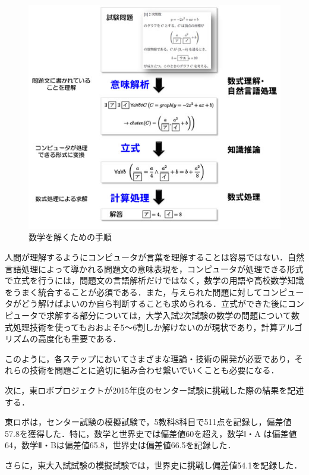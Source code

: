 \begin{figure}[h]
\centering
\includegraphics[width=15cm]{10b.jpg}
\caption{数学を解くための手順}\label{図}
\end{figure}

人間が理解するようにコンピュータが言葉を理解することは容易ではない．自然言語処理によって導かれる問題文の意味表現を，コンピュータが処理できる形式で立式を行うには，問題文の言語解析だけではなく，数学の用語や高校数学知識をうまく統合することが必須である．また，与えられた問題に対してコンピュータがどう解けばよいのか自ら判断することも求められる．立式ができた後にコンピュータで求解する部分については，大学入試2次試験の数学の問題について数式処理技術を使ってもおおよそ5～6割しか解けないのが現状であり，計算アルゴリズムの高度化も重要である．

このように，各ステップにおいてさまざまな理論・技術の開発が必要であり，それらの技術を問題ごとに適切に組み合わせ繋いでいくことも必要になる．

\clearpage

次に，東ロボプロジェクトが2015年度のセンター試験に挑戦した際の結果を記述する．

東ロボは，センター試験の模擬試験で，5教科8科目で511点を記録し，偏差値57.8を獲得した．特に，数学と世界史では偏差値60を超え，数学Ⅰ・A は偏差値64，数学Ⅱ・Bは偏差値65.8，世界史は偏差値66.5を記録した．

さらに，東大入試試験の模擬試験では，世界史に挑戦し偏差値54.1を記録した\cite{tourobo}．


